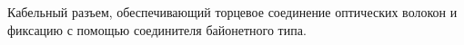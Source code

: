 Кабельный разъем, обеспечивающий торцевое соединение 
оптических волокон и фиксацию с помощью соединителя 
байонетного типа.